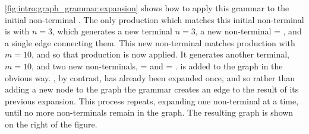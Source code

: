 \autoref{fig:intro:graph_grammar:expansion} shows how to apply this
grammar to the initial non-terminal .  The only production
which matches this initial non-terminal is  with $n=3$,
which generates a new terminal $n = 3$, a new non-terminal
 = , and a single edge connecting them.
This new non-terminal matches production  with $m = 10$,
and so that production is now applied.  It generates another terminal,
$m = 10$, and two new non-terminals,  =
 and  = .  
is added to the graph in the obvious way.  , by contrast,
has already been expanded once, and so rather than adding a new node
to the graph the grammar creates an edge to the result of its previous
expansion.  This process repeats, expanding one non-terminal at a
time, until no more non-terminals remain in the graph.  The resulting
graph is shown on the right of the figure.


